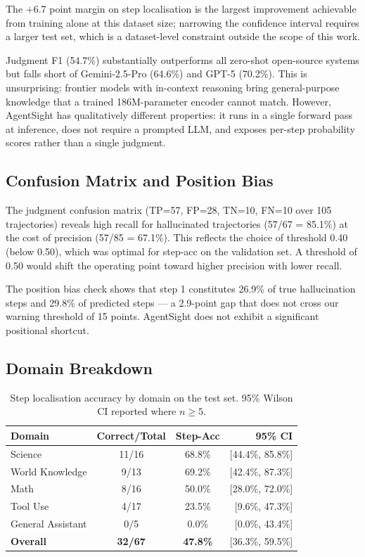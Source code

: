 \documentclass[11pt]{article}
\begin{document}
The $+$6.7 point margin on step localisation is the largest improvement achievable from training alone at this dataset size; narrowing the confidence interval requires a larger test set, which is a dataset-level constraint outside the scope of this work.

Judgment F1 (54.7\%) substantially outperforms all zero-shot open-source systems but falls short of Gemini-2.5-Pro (64.6\%) and GPT-5 (70.2\%). This is unsurprising: frontier models with in-context reasoning bring general-purpose knowledge that a trained 186M-parameter encoder cannot match. However, AgentSight has qualitatively different properties: it runs in a single forward pass at inference, does not require a prompted LLM, and exposes per-step probability scores rather than a single judgment.

\subsection{Confusion Matrix and Position Bias}

The judgment confusion matrix (TP=57, FP=28, TN=10, FN=10 over 105 trajectories) reveals high recall for hallucinated trajectories (57/67 = 85.1\%) at the cost of precision (57/85 = 67.1\%). This reflects the choice of threshold 0.40 (below 0.50), which was optimal for step-acc on the validation set. A threshold of 0.50 would shift the operating point toward higher precision with lower recall.

The position bias check shows that step 1 constitutes 26.9\% of true hallucination steps and 29.8\% of predicted steps --- a 2.9-point gap that does not cross our warning threshold of 15 points. AgentSight does not exhibit a significant positional shortcut.

\subsection{Domain Breakdown}

\begin{table}[h]
\centering
\caption{Step localisation accuracy by domain on the test set. 95\% Wilson CI reported where $n \geq 5$.}
\label{tab:domain}
\begin{tabular}{lccr}
\toprule
\textbf{Domain} & \textbf{Correct/Total} & \textbf{Step-Acc} & \textbf{95\% CI} \\
\midrule
Science            & 11/16 & 68.8\% & [44.4\%, 85.8\%] \\
World Knowledge    & 9/13  & 69.2\% & [42.4\%, 87.3\%] \\
Math               & 8/16  & 50.0\% & [28.0\%, 72.0\%] \\
Tool Use           & 4/17  & 23.5\% & [9.6\%, 47.3\%] \\
General Assistant  & 0/5   & 0.0\%  & [0.0\%, 43.4\%] \\
\midrule
\textbf{Overall}   & \textbf{32/67} & \textbf{47.8\%} & [36.3\%, 59.5\%] \\
\bottomrule
\end{tabular}
\end{table}
\end{document}
